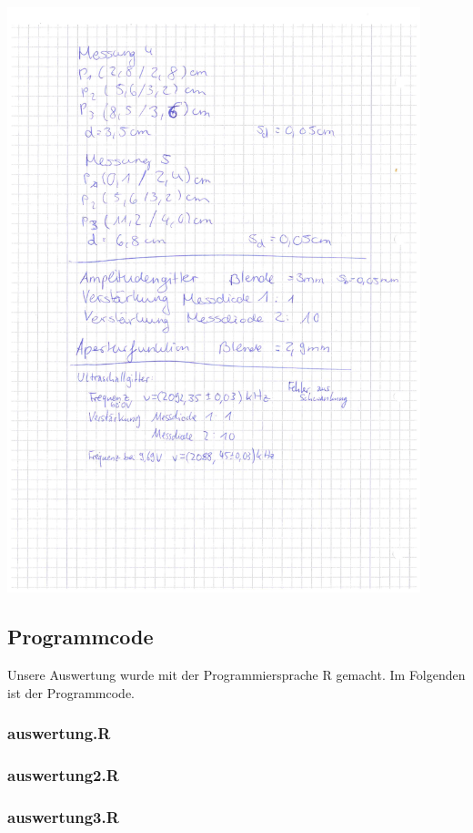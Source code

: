 \documentclass[12pt]{article}
\begin{document}
\begin{minipage}{\textwidth}
\centering
\includegraphics[width=0.9\textwidth]{figures/Laborbuch1.pdf}
\end{minipage}
\newpage
\subsection{Programmcode}
Unsere Auswertung wurde mit der Programmiersprache R gemacht. Im Folgenden ist der Programmcode.
\subsubsection{auswertung.R}\label{auswertungR}

\subsubsection{auswertung2.R}\label{auswertung2}

\subsubsection{auswertung3.R}\label{auswertung3}

\end{document}
